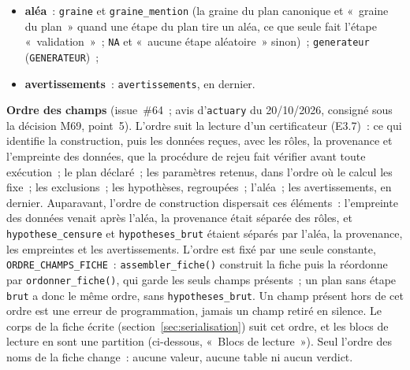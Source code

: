 \documentclass[a4paper,11pt]{article}
\newcommand{\code}[1]{\texttt{\small #1}}
\begin{document}
\begin{itemize}[leftmargin=*, itemsep=2pt]
    \code{hypothese\_censure} (\code{HYPOTHESE\_CENSURE}, ou
    \code{HYPOTHESE\_CENSURE\_DECLAREE} sous la recette des agrégats)~;
    \code{hypotheses\_recette}, \textbf{seulement si l'étape
    \code{exposition} en porte}, soit sous la recette des agrégats~:
    hypothèses de la recette (\code{code}, \code{enonce}, \code{nature},
    \code{statut}), formées par \code{hypotheses\_agregats()}~;
    \code{hypotheses\_brut}, \textbf{seulement
    si l'étape \code{brut} est exécutée}~: copie des paramètres effectifs de
    l'étape \code{estimateurs}, \code{niveau}, \code{exposition\_initiale},
    \code{tolerance\_effectif}, \code{hypotheses} et \code{statuts}, plus
    \code{ensemble\_a\_risque} et \code{denominateur\_instants} si
    l'estimateur \code{kaplan\_meier} est retenu
    (section~\ref{sec:brut-resultat})~;
  \item \textbf{aléa}~: \code{graine} et \code{graine\_mention} (la graine
    du plan canonique et «~graine du plan~» quand une étape du plan tire un
    aléa, ce que seule fait l'étape «~validation~»~; \code{NA} et
    «~aucune étape aléatoire~» sinon)~; \code{generateur}
    (\code{GENERATEUR})~;
  \item \textbf{avertissements}~: \code{avertissements}, en dernier.
\end{itemize}

\noindent
\textbf{Ordre des champs} (issue~\#64~; avis d'\code{actuary} du
20/10/2026, consigné sous la décision M69, point~5). L'ordre suit la lecture d'un
certificateur (E3.7)~: ce qui identifie la construction, puis les données
reçues, avec les rôles, la provenance et l'empreinte des données, que la
procédure de rejeu fait vérifier avant toute exécution~; le plan déclaré~; les
paramètres retenus, dans l'ordre où le calcul les fixe~; les exclusions~;
les hypothèses, regroupées~; l'aléa~; les avertissements, en dernier.
Auparavant, l'ordre de construction dispersait ces éléments~: l'empreinte
des données venait après l'aléa, la provenance était séparée des rôles, et
\code{hypothese\_censure} et \code{hypotheses\_brut} étaient séparés par
l'aléa, la provenance, les empreintes et les avertissements. L'ordre est fixé par une seule constante,
\code{ORDRE\_CHAMPS\_FICHE}~: \code{assembler\_fiche()} construit la fiche
puis la réordonne par \code{ordonner\_fiche()}, qui garde les seuls champs
présents~; un plan sans étape \code{brut} a donc le même ordre, sans
\code{hypotheses\_brut}. Un champ présent hors de cet ordre est une erreur
de programmation, jamais un champ retiré en silence. Le corps de la fiche
écrite (section~\ref{sec:serialisation}) suit cet ordre, et les blocs de
lecture en sont une partition (ci-dessous, «~Blocs de lecture~»). Seul
l'ordre des noms de la fiche change~: aucune valeur, aucune table ni aucun
verdict.
\end{document}
